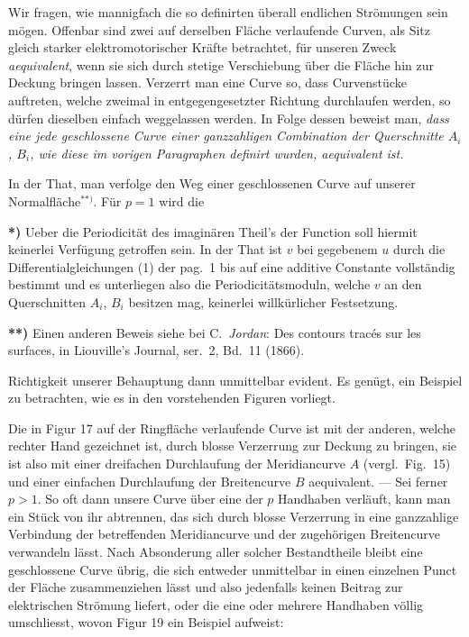 \documentclass{article}
\begin{document}
Wir fragen, wie mannigfach die so definirten überall endlichen Strömungen sein mögen. Offenbar sind zwei auf derselben Fläche verlaufende Curven, als Sitz gleich starker elektromotorischer Kräfte betrachtet, für unseren Zweck \emph{aequivalent}, wenn sie sich durch stetige Verschiebung über die Fläche hin zur Deckung bringen lassen. Verzerrt man eine Curve so, dass Curvenstücke auftreten, welche zweimal in entgegengesetzter Richtung durchlaufen werden, so dürfen dieselben einfach weggelassen werden. In Folge dessen beweist man, \emph{dass eine jede geschlossene Curve einer ganzzahligen Combination der Querschnitte $A_{i}$, $B_{i}$, wie diese im vorigen Paragraphen definirt wurden, aequivalent ist.}


In der That, man verfolge den Weg einer geschlossenen Curve auf unserer Normalfläche${}^{**)}$. Für $p = 1$ wird die

\textbf{*)} Ueber die Periodicität des imaginären Theil's der Function soll hiermit keinerlei Verfügung getroffen sein. In der That ist $v$ bei gegebenem $u$ durch die Differentialgleichungen (1) der pag.~1 bis auf eine additive Constante vollständig bestimmt und es unterliegen also die Periodicitätsmoduln, welche $v$ an den Querschnitten $A_{i}$, $B_{i}$ besitzen mag, keinerlei willkürlicher Festsetzung.

\textbf{**)} Einen anderen Beweis siehe bei C.\ \emph{Jordan}: Des contours tracés sur les surfaces, in Liouville's Journal, ser.~2, Bd.~11 (1866).

Richtigkeit unserer Behauptung dann unmittelbar evident. Es genügt, ein Beispiel zu betrachten, wie es in den vorstehenden Figuren vorliegt.

Die in Figur 17 auf der Ringfläche verlaufende Curve ist mit der anderen, welche rechter Hand gezeichnet ist, durch blosse Verzerrung zur Deckung zu bringen, sie ist also mit einer dreifachen Durchlaufung der Meridiancurve $A$ (vergl.\ Fig.~15) und einer einfachen Durchlaufung der Breitencurve $B$ aequivalent. --- Sei ferner $p > 1$. So oft dann unsere Curve über eine der $p$ Handhaben verläuft, kann man ein Stück von ihr abtrennen, das sich durch blosse Verzerrung in eine ganzzahlige Verbindung der betreffenden Meridiancurve und der zugehörigen Breitencurve verwandeln lässt. Nach Absonderung aller solcher Bestandtheile bleibt eine geschlossene Curve übrig, die sich entweder unmittelbar in einen einzelnen Punct der Fläche zusammenziehen lässt und also jedenfalls keinen Beitrag zur elektrischen Strömung liefert, oder die eine oder mehrere Handhaben völlig umschliesst, wovon Figur 19 ein Beispiel aufweist:
\end{document}
